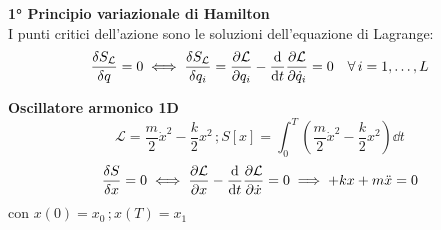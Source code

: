 \begin{theorem}
    \textbf{1° Principio variazionale di Hamilton}\\
    I punti critici dell'azione sono le soluzioni dell'equazione di Lagrange:
    \begin{equation}
        \frac{\delta S_\mathcal{L}}{\delta q}= 0\iff
        \frac{\delta S_\mathcal{L}}{\delta q_i}=\pdv{\mathcal{L}}{q_i}-\dv{t}\pdv{\mathcal{L}}{\dot{q}_i}= 0 \quad \forall\,i = 1,\dots,L
    \end{equation}
\end{theorem}

\begin{example}
    \textbf{Oscillatore armonico 1D}\\
    \begin{equation}
        \mathcal{L}= \frac{m}{2}\dot{x}^2-\frac{k}{2}x^2   \,; S[x]= \int_{0}^{T}\left( \frac{m}{2}\dot{x}^2-\frac{k}{2}x^2 \right)  \dd{t}        
    \end{equation}
    \begin{equation}
        \frac{\delta S }{\delta x}=0 \iff \pdv{\mathcal{L}}{x}-\dv{t} \pdv{\mathcal{L}}{\dot{x}}=0 \implies +kx+m\ddot{x}=0
    \end{equation}
    con $x(0)=x_0\,; x(T)= x_1$
\end{example}

